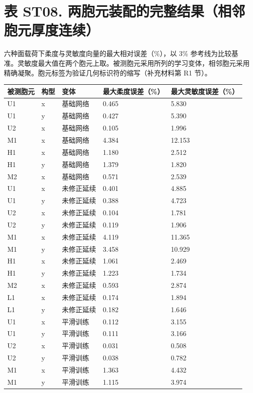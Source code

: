 \documentclass[preprint,12pt,authoryear]{elsarticle}
\begin{document}
\section{表 ST08. 两胞元装配的完整结果（相邻胞元厚度连续）}

六种面载荷下柔度与灵敏度向量的最大相对误差（\%），以 3\% 参考线为比较基准。灵敏度最大值在两个胞元上取。被测胞元采用所列的学习变体，相邻胞元采用精确凝聚。胞元标签为验证几何标识符的缩写（补充材料第 R1 节）。

{\small
\begin{longtable}[]{@{}lllll@{}}
\toprule\noalign{}
被测胞元 & 构型 & 变体 & 最大柔度误差（\%） & 最大灵敏度误差（\%） \\
\midrule\noalign{}
\endhead
\bottomrule\noalign{}
\endlastfoot
U1 & x & 基础网络 & 0.465 & 5.830 \\
U1 & y & 基础网络 & 0.427 & 5.390 \\
U2 & x & 基础网络 & 0.105 & 1.996 \\
M1 & x & 基础网络 & 4.384 & 12.153 \\
H1 & x & 基础网络 & 1.180 & 2.512 \\
H1 & y & 基础网络 & 1.379 & 1.820 \\
M2 & x & 基础网络 & 0.571 & 2.539 \\
U1 & x & 未修正延续 & 0.401 & 4.885 \\
U1 & y & 未修正延续 & 0.388 & 4.723 \\
U2 & x & 未修正延续 & 0.104 & 1.781 \\
U2 & y & 未修正延续 & 0.119 & 1.906 \\
M1 & x & 未修正延续 & 4.119 & 11.365 \\
M1 & y & 未修正延续 & 3.458 & 10.929 \\
H1 & x & 未修正延续 & 1.061 & 2.469 \\
H1 & y & 未修正延续 & 1.223 & 1.734 \\
M2 & x & 未修正延续 & 0.593 & 2.874 \\
L1 & x & 未修正延续 & 0.174 & 1.894 \\
L1 & y & 未修正延续 & 0.182 & 1.646 \\
U1 & x & 平滑训练 & 0.112 & 3.155 \\
U1 & y & 平滑训练 & 0.111 & 3.166 \\
U2 & x & 平滑训练 & 0.031 & 0.508 \\
U2 & y & 平滑训练 & 0.038 & 0.782 \\
M1 & x & 平滑训练 & 1.363 & 4.432 \\
M1 & y & 平滑训练 & 1.115 & 3.974 \\

\end{longtable}}
\end{document}

